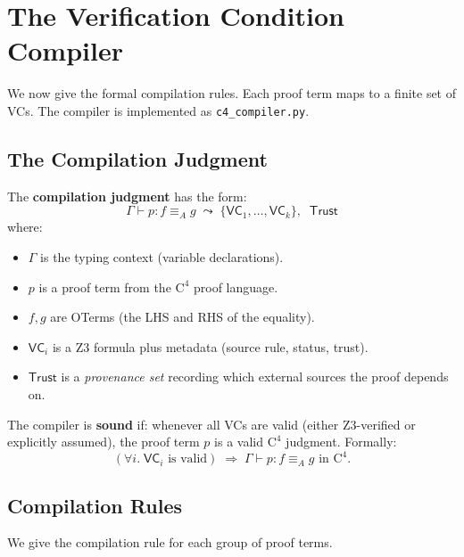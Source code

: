 \section{The Verification Condition Compiler}
\label{sec:vc-compiler}

We now give the formal compilation rules.  Each proof term maps to
a finite set of VCs.  The compiler is implemented as
\texttt{c4\_compiler.py}.


\subsection{The Compilation Judgment}

\begin{definition}[VC Compilation]
\label{def:vc-compilation}
The \textbf{compilation judgment} has the form:
\[
  \Gamma \vdash p : f \equiv_A g
  \;\leadsto\;
  \{\mathsf{VC}_1, \ldots, \mathsf{VC}_k\}, \;\; \mathsf{Trust}
\]
where:
\begin{itemize}
\item $\Gamma$ is the typing context (variable declarations).
\item $p$ is a proof term from the $\mathrm{C}^4$ proof language.
\item $f, g$ are OTerms (the LHS and RHS of the equality).
\item $\mathsf{VC}_i$ is a Z3 formula plus metadata (source rule,
  status, trust).
\item $\mathsf{Trust}$ is a \emph{provenance set} recording which
  external sources the proof depends on.
\end{itemize}
\end{definition}

\begin{definition}
\label{def:vc-soundness}
The compiler is \textbf{sound} if: whenever all VCs are valid
(either Z3-verified or explicitly assumed), the proof term $p$
is a valid $\mathrm{C}^4$ judgment.  Formally:
\[
  \left(\forall i.\; \mathsf{VC}_i \text{ is valid}\right)
  \;\Longrightarrow\;
  \Gamma \vdash p : f \equiv_A g \text{ in } \mathrm{C}^4.
\]
\end{definition}


\subsection{Compilation Rules}

We give the compilation rule for each group of proof terms.

